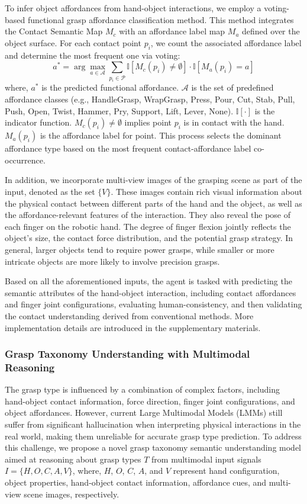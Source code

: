 To infer object affordances from hand-object interactions, we employ a voting-based functional grasp affordance classification method. This method integrates the Contact Semantic Map $M_c$ with an affordance label map $M_a$ defined over the object surface. For each contact point $p_i$, we count the associated affordance label and determine the most frequent one via voting:
 \begin{equation}
a^*=\arg \max _{a \in \mathcal{A}} \sum_{p_i \in \mathcal{P}} \mathbb{I}\left[M_c\left(p_i\right) \neq \emptyset\right] \cdot \mathbb{I}\left[M_a\left(p_i\right)=a\right]
\end{equation}
where, $a^*$ is the predicted functional affordance. $\mathcal{A}$ is the set of predefined affordance classes (e.g., HandleGrasp, WrapGrasp, Press, Pour, Cut, Stab, Pull, Push, Open, Twist, Hammer, Pry, Support, Lift, Lever, None). $\mathbb{I}[\cdot]$ is the indicator function. $M_c\left(p_i\right) \neq \emptyset$ implies point $p_i$ is in contact with the hand. $M_a(p_i)$ is the affordance label for point. This process selects the dominant affordance type based on the most frequent contact-affordance label co-occurrence.


In addition, we incorporate multi-view images of the grasping scene as part of the input, denoted as the set $\{V\}$. These images contain rich visual information about the physical contact between different parts of the hand and the object, as well as the affordance-relevant features of the interaction. They also reveal the pose of each finger on the robotic hand. The degree of finger flexion jointly reflects the object’s size, the contact force distribution, and the potential grasp strategy. In general, larger objects tend to require power grasps, while smaller or more intricate objects are more likely to involve precision grasps. 

Based on all the aforementioned inputs, the agent is tasked with predicting the semantic attributes of the hand-object interaction, including contact affordances and finger joint configurations, evaluating human-consistency, and then validating the contact understanding derived from conventional methods. More implementation details are introduced in the supplementary materials.


\subsubsection{Grasp Taxonomy Understanding with Multimodal Reasoning}
The grasp type is influenced by a combination of complex factors, including hand-object contact information, force direction, finger joint configurations, and object affordances.  
However, current Large Multimodal Models (LMMs) still suffer from significant hallucination when interpreting physical interactions in the real world, making them unreliable for accurate grasp type prediction. 
To address this challenge, we propose a novel grasp taxonomy semantic understanding model aimed at reasoning about grasp types $T$ from multimodal input signals $I=\{H,O,C,A,V\}$, 
where, $H$, $O$, $C$, $A$, and $V$ represent hand configuration, object properties, hand-object contact information, affordance cues, and multi-view scene images, respectively. 


